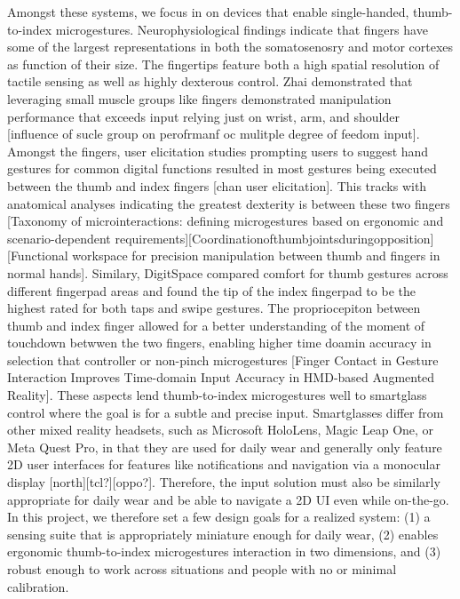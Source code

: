 \documentclass [11pt, proquest] {uwthesis}[2020/02/24]
\begin{document}
Amongst these systems, we focus in on devices that enable single-handed, thumb-to-index microgestures.  Neurophysiological findings indicate that fingers have some of the largest representations in both the somatosenosry and motor cortexes as function of their size. The fingertips feature both a high spatial resolution of tactile sensing as well as highly dexterous control. Zhai demonstrated that leveraging small muscle groups like fingers demonstrated manipulation performance that exceeds input relying just on wrist, arm, and shoulder [influence of sucle group on perofrmanf oc mulitple degree of feedom input]. Amongst the fingers, user elicitation studies prompting users to suggest hand gestures for common digital functions resulted in most gestures being executed between the thumb and index fingers [chan user elicitation]. This tracks with  anatomical analyses indicating the greatest dexterity is between these two fingers [Taxonomy of microinteractions: defining microgestures based on ergonomic and scenario-dependent requirements][Coordinationofthumbjointsduringopposition][Functional workspace for precision manipulation between thumb and fingers in normal hands]. Similary, DigitSpace compared comfort for thumb gestures across different fingerpad areas and found the tip of the index fingerpad to be the highest rated for both taps and swipe gestures. The propriocepiton between thumb and index finger allowed for a better understanding of the moment of touchdown betwwen the two fingers, enabling higher time doamin accuracy in selection that controller or non-pinch microgestures [Finger Contact in Gesture Interaction Improves Time-domain Input Accuracy in HMD-based Augmented Reality]. These aspects lend thumb-to-index microgestures well to smartglass control where the goal is for a subtle and precise input. Smartglasses differ from other mixed reality headsets, such as Microsoft HoloLens, Magic Leap One, or Meta Quest Pro, in that they are used for daily wear and generally only feature 2D user interfaces for features like notifications and navigation via a monocular display [north][tcl?][oppo?]. Therefore, the input solution must also be similarly appropriate for daily wear and be able to navigate a 2D UI even while on-the-go. In this project, we therefore set a few design goals for a realized system: (1) a sensing suite that is appropriately miniature enough for daily wear, (2) enables ergonomic thumb-to-index microgestures interaction in two dimensions, and (3) robust enough to work across situations and people with no or minimal calibration. 
\end{document}
